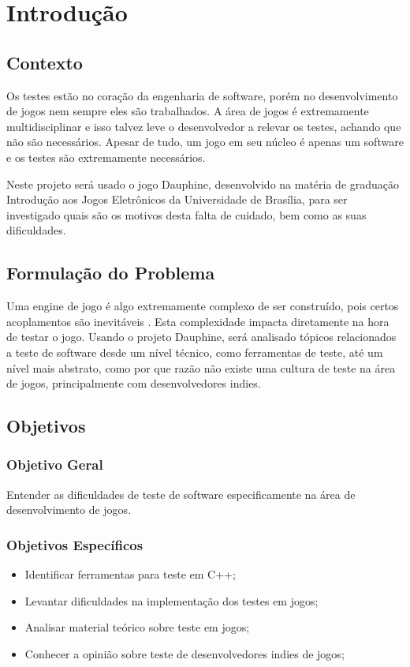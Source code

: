 \chapter[Introdução]{Introdução}

\section{Contexto}

Os testes estão no coração da engenharia de software, porém no desenvolvimento de jogos nem sempre eles são trabalhados. A área de jogos é extremamente multidisciplinar e isso talvez leve o desenvolvedor a relevar os testes, achando que não são necessários. Apesar de tudo, um jogo em seu núcleo é apenas um software e os testes são extremamente necessários.

Neste projeto será usado o jogo Dauphine, desenvolvido na matéria de graduação Introdução aos Jogos Eletrônicos da Universidade de Brasília, para ser investigado quais são os motivos desta falta de cuidado, bem como as suas dificuldades.

\section{Formulação do Problema}

Uma engine de jogo é algo extremamente complexo de ser construído, pois certos acoplamentos são inevitáveis \cite{gregory}. Esta complexidade impacta diretamente na hora de testar o jogo. Usando o projeto Dauphine, será analisado tópicos relacionados a teste de software desde um nível técnico, como ferramentas de teste, até um nível mais abstrato, como por que razão não existe uma cultura de teste na área de jogos, principalmente com desenvolvedores indies.

\section{Objetivos}

\subsection{Objetivo Geral}
Entender as dificuldades de teste de software especificamente na área de desenvolvimento de jogos.

\subsection{Objetivos Específicos}
\begin{itemize}
\item Identificar ferramentas para teste em C++;
\item Levantar dificuldades na implementação dos testes em jogos;
\item Analisar material teórico sobre teste em jogos;
\item Conhecer a opinião sobre teste de desenvolvedores indies de jogos;
\end{itemize}

